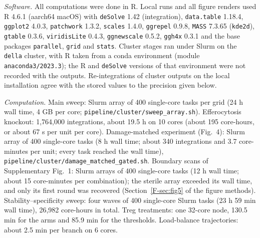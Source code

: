 \documentclass[11pt]{article}
\begin{document}
\emph{Software.} All computations were done in R. Local runs and all figure renders used
R 4.6.1 (aarch64 macOS) with \texttt{deSolve} 1.42 (integration), \texttt{data.table}
1.18.4, \texttt{ggplot2} 4.0.3, \texttt{patchwork} 1.3.2, \texttt{scales} 1.4.0,
\texttt{ggrepel} 0.9.8, \texttt{MASS} 7.3.65 (\texttt{kde2d}), \texttt{gtable} 0.3.6,
\texttt{viridisLite} 0.4.3, \texttt{ggnewscale} 0.5.2, \texttt{ggh4x} 0.3.1 and the base
packages \texttt{parallel}, \texttt{grid} and \texttt{stats}.
Cluster stages ran under Slurm on the \texttt{della} cluster, with R taken from a
conda environment (module \texttt{anaconda3/2023.3}); the R and \texttt{deSolve}
versions of that environment were not recorded with the outputs. Re-integrations of
cluster outputs on the local installation agree with the stored values to the
precision given below.

\emph{Computation.} Main sweep: Slurm array of 400 single-core tasks per grid (24 h wall
time, 4 GB per core; \texttt{pipeline/cluster/sweep\_array.sh}).
Efferocytosis knockout: 1{,}764{,}000 integrations, about 19.5 h on 10 cores (about 195
core-hours, or about 67 s per unit per core). Damage-matched experiment (Fig.~4): Slurm array of 400 single-core
tasks (8 h wall time; about 340 integrations and 3.7 core-minutes per unit; every task
reached the wall time), \texttt{pipeline/cluster/damage\_matched\_gated.sh}. Boundary scans of Supplementary Fig.~1: Slurm arrays of 400 single-core tasks
(12 h wall time; about 15 core-minutes per combination); the sterile array exceeded its
wall time, and only its first round was recovered (Section~\ref{F-sec:fig5} of the figure methods).
Stability--specificity sweep: four waves of 400
single-core Slurm tasks (23 h 59 min wall time), 26{,}982 core-hours in total. Treg
treatments: one 32-core node, 130.5 min for the arms and 85.9 min for the thresholds.
Load-balance trajectories: about 2.5 min per branch on 6 cores.
\end{document}
